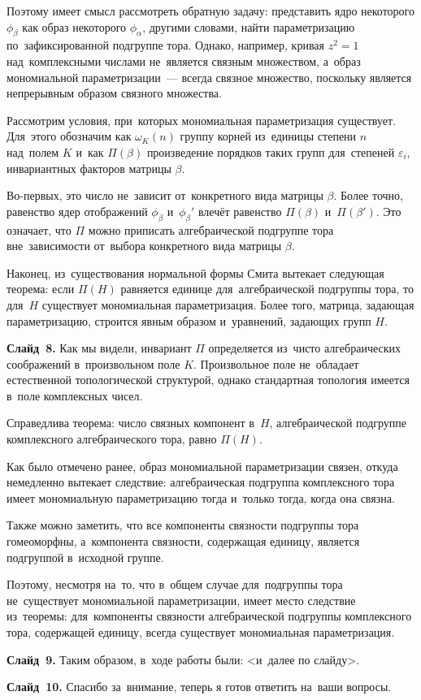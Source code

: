 \documentclass{article}
\begin{document}
  Поэтому имеет смысл рассмотреть обратную задачу: представить ядро некоторого $\phi_\beta$ как образ некоторого $\phi_\alpha$,
  другими словами, найти параметризацию по~зафиксированной подгруппе тора. Однако, например, кривая $z^2 = 1$ над~комплексными числами
  не~является связным множеством, а~образ мономиальной параметризации~— всегда связное множество, поскольку является непрерывным
  образом связного множества.

  Рассмотрим условия, при~которых мономиальная параметризация существует. Для~этого обозначим как $\omega_K(n)$ группу корней из~единицы
  степени $n$ над~полем $K$ и~как $\Pi(\beta)$ произведение порядков таких групп для~степеней $\varepsilon_i$, инвариантных факторов матрицы $\beta$.

  Во-первых, это число не~зависит от~конкретного вида матрицы $\beta$. Более точно, равенство ядер отображений $\phi_\beta$ и~$\phi_\beta'$
  влечёт равенство $\Pi(\beta)$ и~$\Pi(\beta')$. Это означает, что $\Pi$ можно приписать алгебраической подгруппе тора вне~зависимости
  от~выбора конкретного вида матрицы $\beta$.

  Наконец, из~существования нормальной формы Смита вытекает следующая теорема: если $\Pi(H)$ равняется единице для~алгебраической подгруппы
  тора, то для~$H$ существует мономиальная параметризация. Более того, матрица, задающая параметризацию, строится явным образом и~уравнений,
  задающих групп $H$.

  \textbf{Слайд~8.} Как мы видели, инвариант $\Pi$ определяется из~чисто алгебраических соображений в~произвольном поле $K$.
  Произвольное поле не~обладает естественной топологической структурой, однако стандартная топология имеется в~поле комплексных чисел.

  Справедлива теорема: число связных компонент в~$H$, алгебраической подгруппе комплексного алгебраического тора, равно $\Pi(H)$.

  Как было отмечено ранее, образ мономиальной параметризации связен, откуда немедленно вытекает следствие:
  алгебраическая подгруппа комплексного тора имеет мономиальную параметризацию тогда и~только тогда,
  когда она связна.

  Также можно заметить, что все компоненты связности подгруппы тора гомеоморфны, а~компонента связности,
  содержащая единицу, является подгруппой в~исходной группе.

  Поэтому, несмотря на~то, что в~общем случае для~подгруппы тора не~существует мономиальной параметризации,
  имеет место следствие из~теоремы: для~компоненты связности алгебраической подгруппы комплексного тора, содержащей
  единицу, всегда существует мономиальная параметризация.

  \textbf{Слайд~9.} Таким образом, в~ходе работы были: <и~далее по слайду>.

  \textbf{Слайд~10.} Спасибо за~внимание, теперь я готов ответить на~ваши вопросы.
\end{document}
